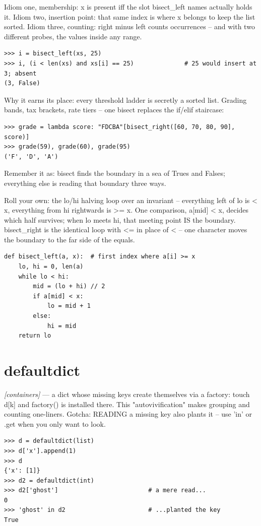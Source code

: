 \documentclass[11pt,letterpaper]{book}
\begin{document}
Idiom one, membership: x is present iff the slot bisect\_left names actually holds it. Idiom two, insertion point: that same index is where x belongs to keep the list sorted. Idiom three, counting: right minus left counts occurrences -- and with two different probes, the values inside any range.

\begin{lstlisting}[style=spec]
>>> i = bisect_left(xs, 25)
>>> i, (i < len(xs) and xs[i] == 25)              # 25 would insert at 3; absent
(3, False)
\end{lstlisting}

Why it earns its place: every threshold ladder is secretly a sorted list. Grading bands, tax brackets, rate tiers -- one bisect replaces the if/elif staircase:

\begin{lstlisting}[style=spec]
>>> grade = lambda score: "FDCBA"[bisect_right([60, 70, 80, 90], score)]
>>> grade(59), grade(60), grade(95)
('F', 'D', 'A')
\end{lstlisting}

Remember it as: bisect finds the boundary in a sea of Trues and Falses; everything else is reading that boundary three ways.


Roll your own: the lo/hi halving loop over an invariant -- everything left of lo is < x, everything from hi rightwards is >= x. One comparison, a[mid] < x, decides which half survives; when lo meets hi, that meeting point IS the boundary. bisect\_right is the identical loop with <= in place of < -- one character moves the boundary to the far side of the equals.

\begin{lstlisting}[style=code]
def bisect_left(a, x):  # first index where a[i] >= x
    lo, hi = 0, len(a)
    while lo < hi:
        mid = (lo + hi) // 2
        if a[mid] < x:
            lo = mid + 1
        else:
            hi = mid
    return lo
\end{lstlisting}

\section{defaultdict}
\noindent\textit{[containers]} --- a dict whose missing keys create themselves via a factory: touch d[k] and factory() is installed there. This "autovivification" makes grouping and counting one-liners. Gotcha: READING a missing key also plants it -- use 'in' or .get when you only want to look.
\begin{lstlisting}[style=spec]
>>> d = defaultdict(list)
>>> d['x'].append(1)
>>> d
{'x': [1]}
>>> d2 = defaultdict(int)
>>> d2['ghost']                         # a mere read...
0
>>> 'ghost' in d2                       # ...planted the key
True
\end{lstlisting}
\end{document}
